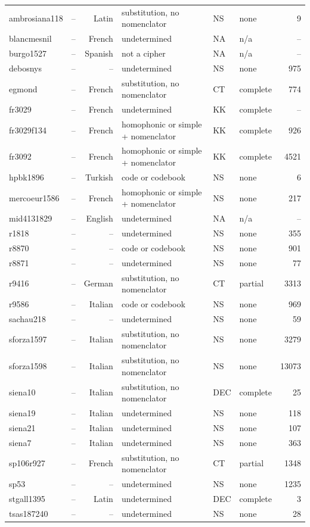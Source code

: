 {\begin{longtable}{@{}llrlllr@{}}
ambrosiana118 & -- & Latin & substitution, no nomenclator & NS & none & 9 \\
blancmesnil & -- & French & undetermined & NA & n/a & -- \\
burgo1527 & -- & Spanish & not a cipher & NA & n/a & -- \\
debosnys & -- & -- & undetermined & NS & none & 975 \\
egmond & -- & French & substitution, no nomenclator & CT & complete & 774 \\
fr3029 & -- & French & undetermined & KK & complete & -- \\
fr3029f134 & -- & French & homophonic or simple + nomenclator & KK & complete & 926 \\
fr3092 & -- & French & homophonic or simple + nomenclator & KK & complete & 4521 \\
hpbk1896 & -- & Turkish & code or codebook & NS & none & 6 \\
mercoeur1586 & -- & French & homophonic or simple + nomenclator & NS & none & 217 \\
mid4131829 & -- & English & undetermined & NA & n/a & -- \\
r1818 & -- & -- & undetermined & NS & none & 355 \\
r8870 & -- & -- & code or codebook & NS & none & 901 \\
r8871 & -- & -- & undetermined & NS & none & 77 \\
r9416 & -- & German & substitution, no nomenclator & CT & partial & 3313 \\
r9586 & -- & Italian & code or codebook & NS & none & 969 \\
sachau218 & -- & -- & undetermined & NS & none & 59 \\
sforza1597 & -- & Italian & substitution, no nomenclator & NS & none & 3279 \\
sforza1598 & -- & Italian & substitution, no nomenclator & NS & none & 13073 \\
siena10 & -- & Italian & substitution, no nomenclator & DEC & complete & 25 \\
siena19 & -- & Italian & undetermined & NS & none & 118 \\
siena21 & -- & Italian & undetermined & NS & none & 107 \\
siena7 & -- & Italian & undetermined & NS & none & 363 \\
sp106r927 & -- & French & substitution, no nomenclator & CT & partial & 1348 \\
sp53 & -- & -- & undetermined & NS & none & 1235 \\
stgall1395 & -- & Latin & undetermined & DEC & complete & 3 \\
tsas187240 & -- & -- & undetermined & NS & none & 28 \\
\end{longtable}}

